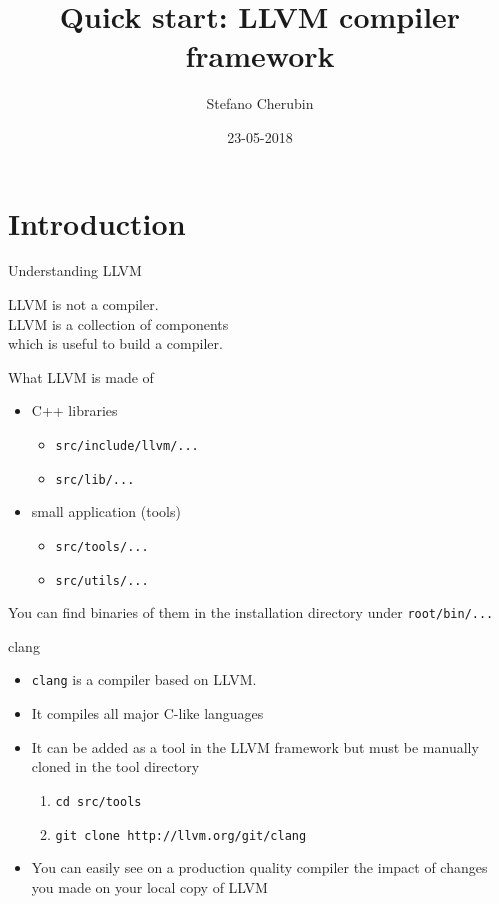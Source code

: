 \documentclass[10pt,mathserif]{beamer}
\author{Stefano Cherubin}
\institute{Politecnico di Milano}
\date{23-05-2018}
\title{Quick start: LLVM compiler framework}
\begin{document}
\begin{frame}
\maketitle
\end{frame}

\section{Introduction}
\begin{frame}{Understanding LLVM}
	\begin{center}
	\huge{
		LLVM is not a compiler.\\
		\pause
		\vfill
		LLVM is a collection of components\\
		which is useful to build a compiler.
	}
	\end{center}
\end{frame}

\begin{frame}{What LLVM is made of}
\begin{itemize}
	\item C++ libraries
		\begin{itemize}
			\item \texttt{src/include/llvm/...}
			\item \texttt{src/lib/...}
		\end{itemize}
		\vfill
	\item small application (tools)
		\begin{itemize}
			\item \texttt{src/tools/...}
			\item \texttt{src/utils/...}
		\end{itemize}
\end{itemize}
\vfill
You can find binaries of them in the installation directory under \texttt{root/bin/...}
\end{frame}

\begin{frame}{clang}
\begin{itemize}
	\item \texttt{clang} is a compiler based on LLVM.
	\vfill
	\item It compiles all major C-like languages
	\vfill
	\item It can be added as a tool in the LLVM framework but must be manually cloned in the tool directory
	\begin{enumerate}
		\item \texttt{cd src/tools}
		\item \texttt{git clone http://llvm.org/git/clang}
	\end{enumerate}
	\vfill
	\item You can easily see on a production quality compiler the impact of changes you made on your local copy of LLVM
\end{itemize}
\end{frame}
\end{document}
